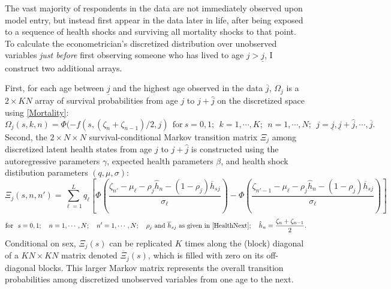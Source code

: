 \documentclass[12pt,pdftex,letterpaper]{article}
\newcommand{\Health}{h}
\newcommand{\ExpHealth}{\overline{\Health}}
\newcommand{\Age}{j}
\newcommand{\Sex}{s}
\newcommand{\AgeMin}{\underline{\Age}}
\newcommand{\AgeMax}{\overline{\Age}}
\newcommand{\AgeIncr}{\hat{\Age}}
\newcommand{\Corr}{\rho}
\newcommand{\DiscreteCut}{\zeta}
\newcommand{\CorrParam}{\gamma}
\newcommand{\HealthParam}{\beta}
\newcommand{\ShockMean}{\mu}
\newcommand{\ShockStd}{\sigma}
\newcommand{\MixProb}{q}
\newcommand{\LivPrb}{\Omega}
\newcommand{\TransPrb}{\Xi}
\begin{document}
The vast majority of respondents in the data are not immediately observed upon model entry, but instead first appear in the data later in life, after being exposed to a sequence of health shocks and surviving all mortality shocks to that point. To calculate the econometrician's discretized distribution over unobserved variables \textit{just before} first observing someone who has lived to age $\Age > \AgeMin$, I construct two additional arrays.

First, for each age between $\AgeMin$ and the highest age observed in the data $\AgeMax$, $\LivPrb_\Age$ is a $2 \times KN$ array of survival probabilities from age $\Age$ to $\Age + \AgeIncr$ on the discretized space using \eqref{Mortality}:
\begin{equation}
\LivPrb_\Age(\Sex,k,n) = \Phi(-f(\Sex,(\DiscreteCut_n+\DiscreteCut_{n-1})/2, \Age) ~~\text{for}~ s=0,1; ~~ k=1,\cdots,K; ~~n=1,\cdots,N; ~~ \Age=\AgeMin,\AgeMin+\AgeIncr,\cdots,\AgeMax.
\end{equation}
Second, the $2 \times N \times N$ survival-conditional Markov transition matrix $\TransPrb_\Age$ among discretized latent health states from age $\Age$ to $\Age + \AgeIncr$ is constructed using the autoregressive parameters $\CorrParam$, expected health parameters $\HealthParam$, and health shock distibution parameters $(\MixProb,\ShockMean,\ShockStd)$:
\begin{equation}
\TransPrb_\Age(\Sex,n,n') = \sum_{\ell=1}^L \MixProb_\ell \left[ \Phi \left( \frac{\DiscreteCut_{n'} - \ShockMean_\ell - \Corr_{\Age} \hat{\Health}_n - (1-\Corr_{\Age})\ExpHealth_{\Sex\Age}}{\ShockStd_\ell} \right) - \Phi \left( \frac{\DiscreteCut_{n'-1} - \ShockMean_\ell - \Corr_{\Age} \hat{\Health}_n - (1-\Corr_{\Age})\ExpHealth_{\Sex\Age}}{\ShockStd_\ell} \right) \right]
\end{equation}
\begin{equation*}
\text{for}~~s =0,1; ~~~ n=1,\cdots,N; ~~~ n'=1,\cdots,N; ~~~ \Corr_{\Age} ~\text{and}~ \ExpHealth_{\Sex\Age} ~\text{as given in \eqref{HealthNext}}; ~~~ \hat{\Health}_n = \frac{\DiscreteCut_n + \DiscreteCut_{n-1}}{2}.
\end{equation*}
Conditional on sex, $\TransPrb_\Age(\Sex)$ can be replicated $K$ times along the (block) diagonal of a $KN \times KN$ matrix denoted $\overline{\TransPrb}_\Age(\Sex)$, which is filled with zero on its off-diagonal blocks. This larger Markov matrix represents the overall transition probabilities among discretized unobserved variables from one age to the next.
\end{document}
